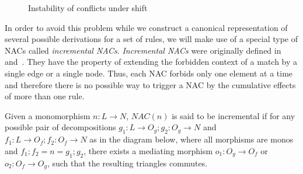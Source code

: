 \begin{figure}[!ht]
  \centering
  \caption{Instability of conflicts under shift\\}\label{fig:process:instability}
\end{figure}

In order to avoid this problem while we construct a canonical representation of several possible derivations for a set of rules, we will make use of a special type of NACs called \emph{incremental NACs}. \emph{Incremental NACs} were originally defined in~\cite{Corradini2013} and~\cite{Corradini2014}. They have the property of extending the forbidden context of a match by a single edge or a single node. Thus, each NAC forbids only one element at a time and therefore there is no possible way to trigger a NAC by the cumulative effects of more than one rule.

\begin{definition} Given a monomorphism \mbox{$n : L \rightarrow N$}, $NAC(n)$ is said to be incremental if for any possible pair of decompositions \mbox{$g_1 : L \rightarrow O_g;g_2 : O_g \rightarrow N$} and \mbox{$f_1 : L \rightarrow O_f;f_2 : O_f \rightarrow N$} as in the diagram below, where all morphisms are monos and \mbox{$f_1;f_2 = n = g_1;g_2$}, there exists a mediating morphism $o_1 : O_g \rightarrow O_f$ or $o_2 : O_f \rightarrow O_g$, such that the resulting triangles
  commutes.


\end{definition}

